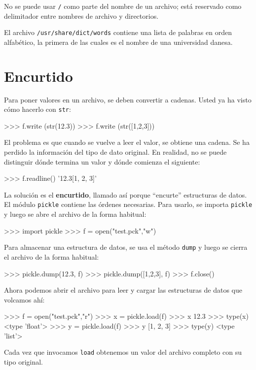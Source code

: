  

No se puede usar \texttt{/} como parte del nombre de un archivo; está
reservado como delimitador entre nombres de archivo y directorios.

El archivo \texttt{/usr/share/dict/words} contiene una lista de palabras
en orden alfabético, la primera de las cuales es el nombre de una
universidad danesa.

\section{Encurtido}


Para poner valores en un archivo, se deben convertir a cadenas. Usted
ya ha visto cómo hacerlo con \texttt{str}:
\begin{pyconcode}
>>> f.write (str(12.3))
>>> f.write (str([1,2,3]))
\end{pyconcode}
 El problema es que cuando se vuelve a leer el valor, se obtiene una
cadena. Se ha perdido la información del tipo de dato original. En
realidad, no se puede distinguir dónde termina un valor y dónde comienza
el siguiente:

\begin{pyconcode}
>>>   f.readline()
'12.3[1, 2, 3]'
\end{pyconcode}
 La solución es el \textbf{encurtido}, llamado así porque ``encurte''
estructuras de datos. El módulo \texttt{pickle} contiene las órdenes
necesarias. Para usarlo, se importa \texttt{pickle} y luego se abre
el archivo de la forma habitual:
\begin{pyconcode}
>>> import pickle
>>> f = open("test.pck","w")
\end{pyconcode}

Para almacenar una estructura de datos, se usa el método \texttt{dump}
y luego se cierra el archivo de la forma habitual:
\begin{pyconcode}
>>> pickle.dump(12.3, f)
>>> pickle.dump([1,2,3], f)
>>> f.close()
\end{pyconcode}

Ahora podemos abrir el archivo para leer y cargar las estructuras
de datos que volcamos ahí:

\begin{pyconcode}
>>> f = open("test.pck","r")
>>> x = pickle.load(f)
>>> x
12.3
>>> type(x)
<type 'float'>
>>> y = pickle.load(f)
>>> y
[1, 2, 3]
>>> type(y)
<type 'list'>
\end{pyconcode}
 Cada vez que invocamos \texttt{load} obtenemos un valor del archivo
completo con su tipo original.


